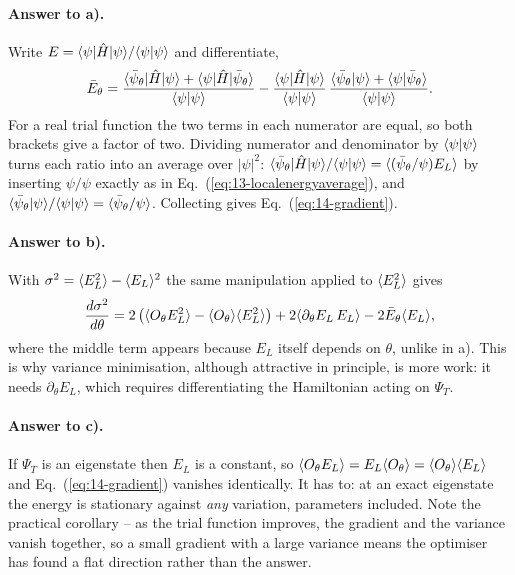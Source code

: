 \paragraph{Answer to a).}
Write $E=\langle \psi | \hat{H} | \psi \rangle/\langle \psi \vert \psi \rangle$ and differentiate,
\[
  \bar{E}_{\theta}
   = \frac{\langle \bar\psi_\theta | \hat{H} | \psi \rangle
      + \langle \psi | \hat{H} | \bar\psi_\theta \rangle}{\langle \psi \vert \psi \rangle}
   - \frac{\langle \psi | \hat{H} | \psi \rangle}{\langle \psi \vert \psi \rangle}\,
     \frac{\langle \bar\psi_\theta \vert \psi \rangle
      + \langle \psi \vert \bar\psi_\theta \rangle}{\langle \psi \vert \psi \rangle} .
\]
For a real trial function the two terms in each numerator are equal, so both
brackets give a factor of two.  Dividing numerator and denominator by
$\langle \psi \vert \psi \rangle$ turns each ratio into an average over $|\psi|^2$:
$\langle \bar\psi_\theta | \hat{H} | \psi \rangle/\langle \psi \vert \psi \rangle
= \langle (\bar\psi_\theta/\psi)E_L \rangle$ by inserting $\psi/\psi$ exactly as in
Eq.~(\ref{eq:13-localenergyaverage}), and
$\langle \bar\psi_\theta \vert \psi \rangle/\langle \psi \vert \psi \rangle
= \langle \bar\psi_\theta/\psi \rangle$.  Collecting gives
Eq.~(\ref{eq:14-gradient}).

\paragraph{Answer to b).}
With $\sigma^2=\langle E_L^2 \rangle-\langle E_L \rangle^2$ the same manipulation applied to
$\langle E_L^2 \rangle$ gives
\[
  \frac{d\sigma^2}{d\theta}
   = 2\left(\langle O_\theta E_L^2 \rangle - \langle O_\theta \rangle\langle E_L^2 \rangle\right)
     + 2\langle \partial_\theta E_L\,E_L \rangle
     - 2\bar{E}_\theta\langle E_L \rangle ,
\]
where the middle term appears because $E_L$ itself depends on $\theta$,
unlike in a).  This is why variance minimisation, although attractive in
principle, is more work: it needs $\partial_\theta E_L$, which requires
differentiating the Hamiltonian acting on $\Psi_T$.

\paragraph{Answer to c).}
If $\Psi_T$ is an eigenstate then $E_L$ is a constant, so
$\langle O_\theta E_L \rangle = E_L\langle O_\theta \rangle = \langle O_\theta \rangle\langle E_L \rangle$ and
Eq.~(\ref{eq:14-gradient}) vanishes identically.  It has to: at an exact
eigenstate the energy is stationary against \emph{any} variation, parameters
included.  Note the practical corollary -- as the trial function improves, the
gradient and the variance vanish together, so a small gradient with a large
variance means the optimiser has found a flat direction rather than the
answer.

